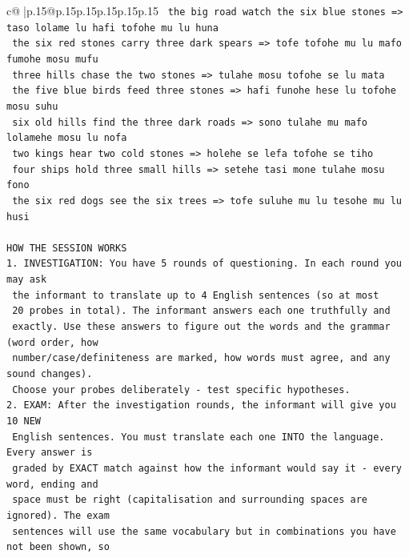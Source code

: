 \documentclass{article}
\begin{document}
{\begin{supertabular}{c@{$\;$}|p{.15\linewidth}@{}p{.15\linewidth}p{.15\linewidth}p{.15\linewidth}p{.15\linewidth}p{.15\linewidth}}
{{{\texttt{    the big road watch the six blue stones  =>  taso lolame lu hafi tofohe mu lu huna} \\
\texttt{    the six red stones carry three dark spears  =>  tofe tofohe mu lu mafo fumohe mosu mufu} \\
\texttt{    three hills chase the two stones  =>  tulahe mosu tofohe se lu mata} \\
\texttt{    the five blue birds feed three stones  =>  hafi funohe hese lu tofohe mosu suhu} \\
\texttt{    six old hills find the three dark roads  =>  sono tulahe mu mafo lolamehe mosu lu nofa} \\
\texttt{    two kings hear two cold stones  =>  holehe se lefa tofohe se tiho} \\
\texttt{    four ships hold three small hills  =>  setehe tasi mone tulahe mosu fono} \\
\texttt{    the six red dogs see the six trees  =>  tofe suluhe mu lu tesohe mu lu husi} \\
\\ 
\texttt{HOW THE SESSION WORKS} \\
\texttt{1. INVESTIGATION: You have 5 rounds of questioning. In each round you may ask} \\
\texttt{   the informant to translate up to 4 English sentences (so at most} \\
\texttt{   20 probes in total). The informant answers each one truthfully and} \\
\texttt{   exactly. Use these answers to figure out the words and the grammar (word order, how} \\
\texttt{   number/case/definiteness are marked, how words must agree, and any sound changes).} \\
\texttt{   Choose your probes deliberately {-} test specific hypotheses.} \\
\texttt{2. EXAM: After the investigation rounds, the informant will give you 10 NEW} \\
\texttt{   English sentences. You must translate each one INTO the language. Every answer is} \\
\texttt{   graded by EXACT match against how the informant would say it {-} every word, ending and} \\
\texttt{   space must be right (capitalisation and surrounding spaces are ignored). The exam} \\
\texttt{   sentences will use the same vocabulary but in combinations you have not been shown, so} \\
}}}
\end{supertabular}}
\end{document}
